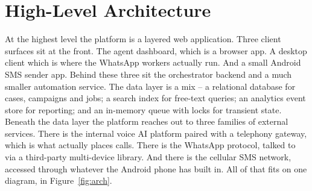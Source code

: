 \section{High-Level Architecture}
At the highest level the platform is a layered web application. Three client surfaces sit at the front. The agent dashboard, which is a browser app. A desktop client which is where the WhatsApp workers actually run. And a small Android SMS sender app. Behind these three sit the orchestrator backend and a much smaller automation service. The data layer is a mix -- a relational database for cases, campaigns and jobs; a search index for free-text queries; an analytics event store for reporting; and an in-memory queue with locks for transient state. Beneath the data layer the platform reaches out to three families of external services. There is the internal voice AI platform paired with a telephony gateway, which is what actually places calls. There is the WhatsApp protocol, talked to via a third-party multi-device library. And there is the cellular SMS network, accessed through whatever the Android phone has built in. All of that fits on one diagram, in Figure~\ref{fig:arch}.

